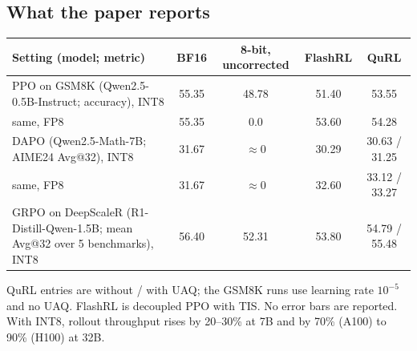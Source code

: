 \documentclass[11pt]{article}
\begin{document}
\subsection{What the paper reports}\label{sec:reports}
\begin{center}\small
\begin{tabularx}{\linewidth}{@{}L c c c c@{}}
\toprule
Setting (model; metric) & BF16 & 8-bit, uncorrected & FlashRL & QuRL\\
\midrule
PPO on GSM8K (Qwen2.5-0.5B-Instruct; accuracy), INT8 & 55.35 & 48.78 & 51.40 & 53.55\\
\quad same, FP8 & 55.35 & 0.0 & 53.60 & 54.28\\
DAPO (Qwen2.5-Math-7B; AIME24 Avg@32), INT8 & 31.67 & ${\approx}0$ & 30.29 & 30.63 / 31.25\\
\quad same, FP8 & 31.67 & ${\approx}0$ & 32.60 & 33.12 / 33.27\\
GRPO on DeepScaleR (R1-Distill-Qwen-1.5B; mean Avg@32 over 5 benchmarks), INT8 & 56.40 & 52.31 & 53.80 & 54.79 / 55.48\\
\bottomrule
\end{tabularx}
\end{center}
QuRL entries are without / with UAQ; the GSM8K runs use learning rate $10^{-5}$ and no UAQ. FlashRL is decoupled PPO with TIS. No error bars are reported. With INT8, rollout throughput rises by 20--30\% at 7B and by 70\% (A100) to 90\% (H100) at 32B.



\end{document}
